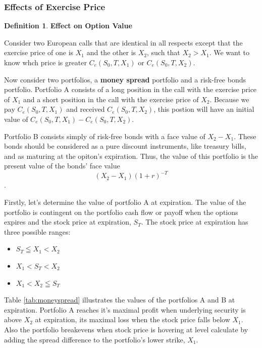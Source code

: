 \documentclass{book}
\theoremstyle{definition}
\newtheorem{definition}{Definition}[section]
\theoremstyle{remark}
\begin{document}
        \subsubsection{Effects of Exercise Price}
            \begin{definition}{\textbf{Effect on Option Value}}
                
                Consider two European calls that are identical in all respects except that the exercise price of one is $X_1$ and the other is $X_2$, such that $X_2 > X_1$. We want to know whch price is greater $C_e(S_0, T, X_1)$ or $C_e(S_0, T, X_2)$. 
                
                Now consider two portfolios, a \textbf{money spread} portfolio and a risk-free bonds portfolio. Portfolio A consists of a long position in the call with the exercise price of $X_1$ and a short position in the call with the exercise price of $X_2$. Because we pay $C_e(S_0, T, X_1)$ and received $C_e(S_0, T, X_2)$, this postion will have an initial value of $C_e(S_0, T, X_1) - C_e(S_0, T, X_2)$. 
                
                Portfolio B consists simply of risk-free bonds with a face value of $X_2 - X_1$. These bonds should be considered as a pure discount instruments, like treasury bills, and as maturing at the opiton's expiration. Thus, the value of this portfolio is the present value of the bonds' face value $$ (X_2 - X_1)(1+r)^{-T} $$.
                
                Firstly, let's determine the value of portfolio A at expiration. The value of the portfolio is contingent on the portfolio cash flow or payoff when the options expires and the stock price at expiration, $S_T$. The stock price at expiration has three possible ranges:
                    \begin{itemize}
                        \item $S_T \leqq X_1 < X_2$
                        \item $X_1 < S_T < X_2$
                        \item $X_1 < X_2 \leqq S_T$
                    \end{itemize}
                
                Table \ref{tab:moneyspread} illustrates the values of the portfolios A and B at expiration. Portfolio A reaches it's maximal profit when underlying security is above $X_2$ at expiration, its maximal loss when the stock price falls below $X_1$. Also the portfolio breakevens when stock price is hovering at level calculate by adding the spread difference to the portfolio's lower strike, $X_1$.  
                

\end{definition}
\end{document}
